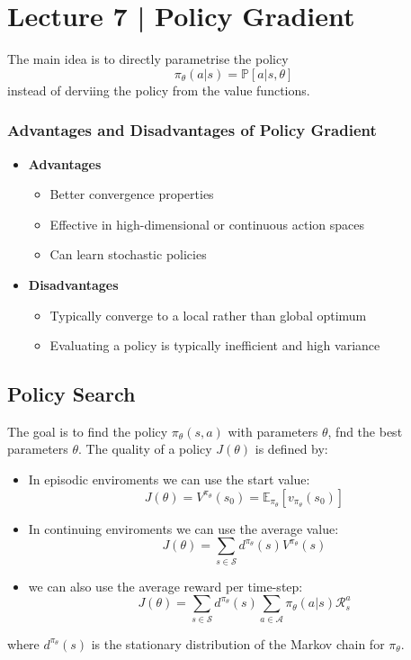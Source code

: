 \section{Lecture 7 | Policy Gradient}
The main idea is to directly parametrise the policy
\[
\pi_\theta(a|s) = \mathbb{P}[a|s,\theta]  
\]
instead of derviing the policy from the value functions.

\subsubsection*{Advantages and Disadvantages of Policy Gradient}
\begin{itemize}
    \item \textbf{Advantages}
    \begin{itemize}
        \item Better convergence properties
        \item Effective in high-dimensional or continuous action spaces
        \item Can learn stochastic policies
    \end{itemize}
    \item \textbf{Disadvantages}
    \begin{itemize}
        \item Typically converge to a local rather than global optimum
        \item Evaluating a policy is typically inefficient and high variance
    \end{itemize}
\end{itemize}

\subsection{Policy Search}
The goal is to find the policy \(\pi _\theta (s,a) \) with parameters \(\theta\),
fnd the best parameters \(\theta\). The quality of a policy \(J(\theta)\) is defined by:

\begin{itemize}
    \item In episodic enviroments we can use the start value:
    \[
        J(\theta) = V^{\pi_\theta}(s_0) = \mathbb{E}_{\pi_\theta}[v_{\pi_\theta}(s_0)]  
    \]
    \item In continuing enviroments we can use the average value:
    \[
        J(\theta) = \sum_{s \in \mathcal{S}} d^{\pi_\theta}(s) V^{\pi_\theta}(s)
    \]
    \item we can also use the average reward per time-step:
    \[
        J(\theta) = \sum_{s \in \mathcal{S}} d^{\pi_\theta}(s) \sum_{a \in \mathcal{A}}
         \pi_\theta(a|s) \mathcal{R}^a_s
    \]
\end{itemize}
where \(d^{\pi_\theta}(s)\) is the stationary distribution of the Markov chain for \(\pi_\theta\).

